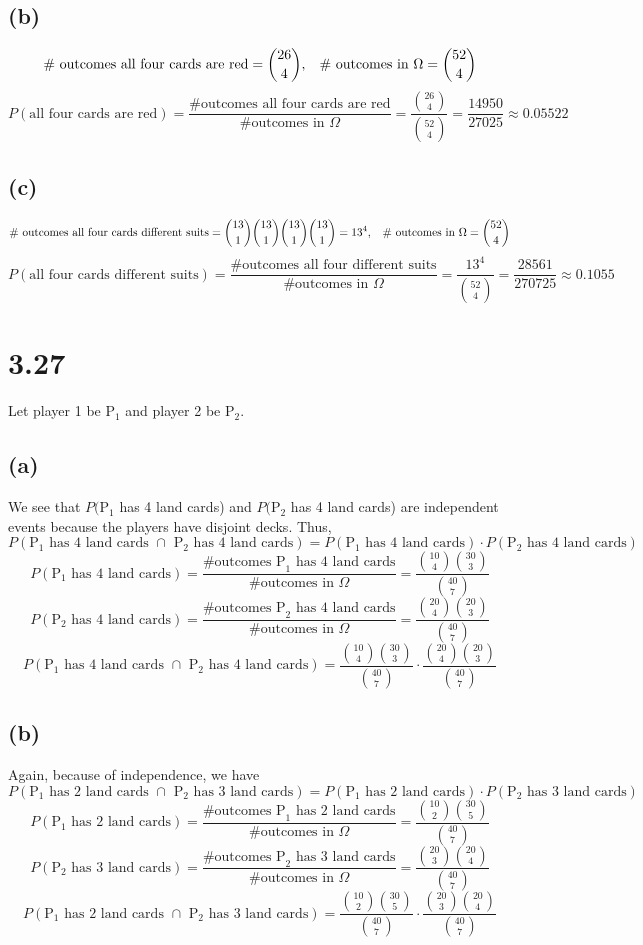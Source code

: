 \documentclass[11pt]{article}
\begin{document}
\subsection*{(b)}
\[\text{\# outcomes all four cards are red}=\binom{26}{4},\hspace{3mm}\text{\# outcomes in }\Omega=\binom{52}{4}\]
\[P(\text{all four cards are red})=\frac{\text{\# outcomes all four cards are red}}{\text{\# outcomes in }\Omega}=\frac{\binom{26}{4}}{\binom{52}{4}}=\frac{14950}{27025}\approx 0.05522\]
\subsection*{(c)}
\[\text{\# outcomes all four cards different suits}=\binom{13}{1}\binom{13}{1}\binom{13}{1}\binom{13}{1}=13^4,\hspace{3mm}\text{\# outcomes in }\Omega=\binom{52}{4}\]
\[P(\text{all four cards different suits})=\frac{\text{\# outcomes all four different suits}}{\text{\# outcomes in }\Omega}=\frac{13^4}{\binom{52}{4}}=\frac{28561}{270725}\approx 0.1055\]
\section*{3.27}
Let player 1 be P$_1$ and player 2 be P$_2$.
\subsection*{(a)}
We see that $P($P$_1$ has 4 land cards) and $P($P$_2$ has 4 land cards) are independent events because the players have disjoint decks. Thus, 
\[P(\text{P}_1 \text{ has 4 land cards }\cap\text{ P}_2 \text{ has 4 land cards})=P(\text{P}_1\text{ has 4 land cards})\cdot P(\text{P}_2\text{ has 4 land cards})\]
\[P(\text{P}_1\text{ has 4 land cards})=\frac{\text{\# outcomes P}_1\text{ has 4 land cards}}{\text{\# outcomes in }\Omega}=\frac{\binom{10}{4}\binom{30}{3}}{\binom{40}{7}}\]
\[P(\text{P}_2\text{ has 4 land cards})=\frac{\text{\# outcomes P}_2\text{ has 4 land cards}}{\text{\# outcomes in }\Omega}=\frac{\binom{20}{4}\binom{20}{3}}{\binom{40}{7}}\]
\[P(\text{P}_1\text{ has 4 land cards }\cap\text{ P}_2\text{ has 4 land cards})=\frac{\binom{10}{4}\binom{30}{3}}{\binom{40}{7}}\cdot\frac{\binom{20}{4}\binom{20}{3}}{\binom{40}{7}}\]
\subsection*{(b)}
Again, because of independence, we have
\[P(\text{P}_1 \text{ has 2 land cards }\cap\text{ P}_2 \text{ has 3 land cards})=P(\text{P}_1\text{ has 2 land cards})\cdot P(\text{P}_2\text{ has 3 land cards})\]
\[P(\text{P}_1\text{ has 2 land cards})=\frac{\text{\# outcomes P}_1\text{ has 2 land cards}}{\text{\# outcomes in }\Omega}=\frac{\binom{10}{2}\binom{30}{5}}{\binom{40}{7}}\]
\[P(\text{P}_2\text{ has 3 land cards})=\frac{\text{\# outcomes P}_2\text{ has 3 land cards}}{\text{\# outcomes in }\Omega}=\frac{\binom{20}{3}\binom{20}{4}}{\binom{40}{7}}\]
\[P(\text{P}_1\text{ has 2 land cards }\cap\text{ P}_2\text{ has 3 land cards})=\frac{\binom{10}{2}\binom{30}{5}}{\binom{40}{7}}\cdot\frac{\binom{20}{3}\binom{20}{4}}{\binom{40}{7}}\]
\clearpage
\end{document}
